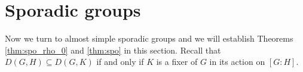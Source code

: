 \documentclass[twoside,a4paper,reqno,11pt]{amsart}
\newcommand{\<}{\langle}
\renewcommand{\>}{\rangle}
\newcommand{\la}{\langle}
\newcommand{\ra}{\rangle}
\newcommand{\leqs}{\leqslant}
\newcommand{\geqs}{\geqslant}
\newtheorem{lem}[thm]{Lemma}
\theoremstyle{definition}
\begin{document}
	
	
	
	
	
	
	
	\section{Sporadic groups}
	
	\label{s:spo}
	
	Now we turn to almost simple sporadic groups and we will establish Theorems \ref{thm:spo_rho_0} and \ref{thm:spo} in this section. Recall that $D(G,H)\subseteq D(G,K)$ if and only if $K$ is a fixer of $G$ in its action on $[G:H]$.
	
\end{document}
